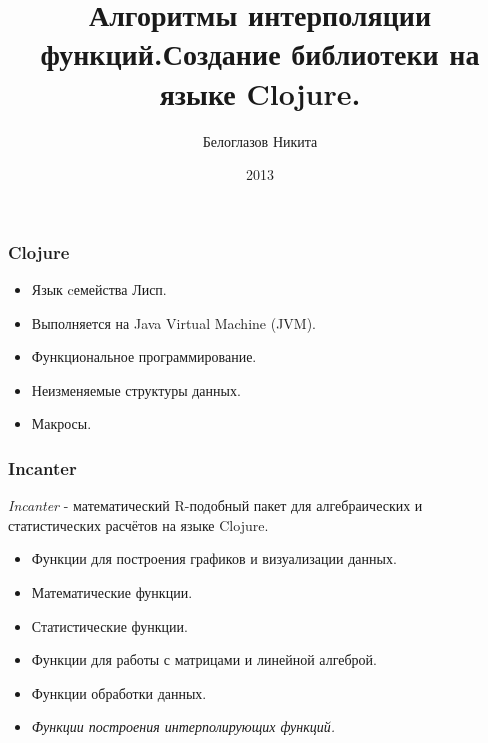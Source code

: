 \documentclass[rpussian]{beamer}
\title[Интерполяция]{Алгоритмы интерполяции функций.\newline Создание библиотеки на языке Clojure.}
\author{Белоглазов Никита}
\date{2013}
\institute{Белорусский Государственный Университет}
\begin{document}
\maketitle
\begin{frame}[fragile]
  \frametitle{Clojure}

  \begin{itemize}
  \item Язык cемейства Лисп.
  \item Выполняется на Java Virtual Machine (JVM).
  \item Функциональное программирование.
  \item Неизменяемые структуры данных.
  \item Макросы.
  \end{itemize}

\end{frame}

\begin{frame}
  \frametitle{Incanter}

  \emph{Incanter} - математический R-подобный пакет для алгебраических и статистических расчётов на языке Clojure.

  \begin{itemize}

  \item Функции для построения графиков и визуализации данных.

  \item Математические функции.

  \item Статистические функции.

  \item Функции для работы с матрицами и линейной алгеброй.

  \item Функции обработки данных.

  \item \emph{Функции построения интерполирующих функций.}
  \end{itemize}
\end{frame}
\end{document}

